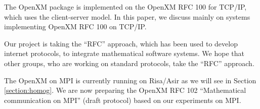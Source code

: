 The OpenXM package is implemented on the OpenXM RFC 100 for TCP/IP, 
which uses the client-server model.
In this paper, we discuss mainly on systems implementing
OpenXM RFC 100 on TCP/IP.

Our project is taking the ``RFC'' approach, which has been
used to develop internet protocols, to integrate mathematical software
systems.
We hope that other groups, who are working on standard protocols,
take the ``RFC'' approach.

The OpenXM on MPI \cite{MPI} is currently running on Risa/Asir
as we will see in Section \ref{section:homog}.
We are now preparing the OpenXM RFC 102 ``Mathematical communication
on MPI'' (draft protocol)
based on our experiments on MPI.









